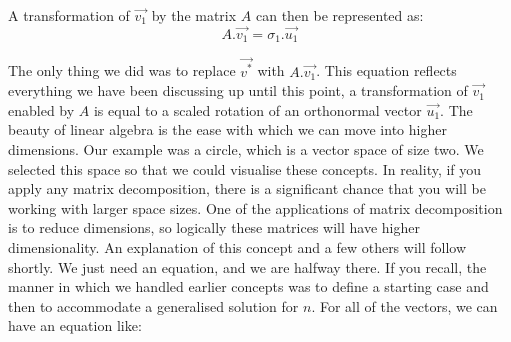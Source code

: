 \documentclass[a4,12pt,twosided,openany]{memoir}
\begin{document}
\begin{center}
\end{center}
\par 
\indent
A transformation of $\overrightarrow{v_1}$ by the matrix $A$ can then be represented as:
\[A.\overrightarrow{v_1} = \sigma_1.\overrightarrow{u_1} \]
\par 
\indent
The only thing we did was to replace $\overrightarrow{v^*}$ with $A.\overrightarrow{v_1}$. This equation reflects everything we have been discussing up until this point, a transformation of $\overrightarrow{v_1}$ enabled by $A$ is equal to a scaled rotation of an orthonormal vector $\overrightarrow{u_1}$. The beauty of linear algebra is the ease with which we can move into higher dimensions. Our example was a circle, which is a vector space of size two. We selected this space so that we could visualise these concepts. In reality, if you apply any matrix decomposition, there is a significant chance that you will be working with larger space sizes. One of the applications of matrix decomposition is to reduce dimensions, so logically these matrices will have higher dimensionality. An explanation of this concept and a few others will follow shortly. We just need an equation, and we are halfway there. If you recall, the manner in which we handled earlier concepts was to define a starting case and then to accommodate a generalised solution for $n$. For all of the vectors, we can have an equation like:
\end{document}
